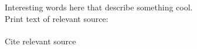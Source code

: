 \documentclass[main]{subfiles}
\begin{document}
Interesting words here that describe something cool.\\
Print text of relevant source:\\
\\
Cite relevant source \cite{testcitation}


\end{document}
